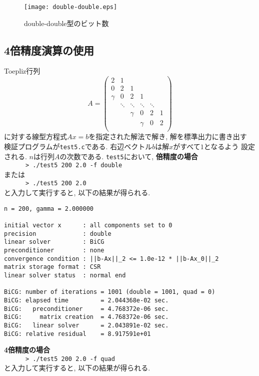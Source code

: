 \documentclass[a4paper]{jarticle}
\begin{document}
{{\begin{figure}[htp]
{\centering 
\texttt{[image: double-double.eps]}
\caption{double-double型のビット数}
\label{fig:residual}
  }
\end{figure}

\subsection{4倍精度演算の使用}
\label{sec:testprog4}
Toepliz行列
\[
A = \left(
\begin{array}{cccccc}
2 & 1 &   &  &  & \\
0 & 2 & 1 &  &  & \\
\gamma & 0& 2 & 1 &  & \\
 & \ddots & \ddots & \ddots & \ddots & \\
 &  &   \gamma &0 &       2   & 1 \\
 &  &  &   \gamma & 0& 2 \\
\end{array}
\right)
\]
に対する線型方程式$Ax=b$を指定された解法で解き, 解を標準出力に書き出す
検証プログラムが\verb|test5.c|である. 
右辺ベクトル$b$は解$x$がすべて$1$となるよう
設定される. $n$は行列$A$の次数である. 
\verb|test5|において, 
\newpage
{\bf 倍精度の場合}\\
\verb+      > ./test5 200 2.0 -f double+ \\
または \\
\verb+      > ./test5 200 2.0+ \\
と入力して実行すると, 以下の結果が得られる. 

\begin{verbatim}
n = 200, gamma = 2.000000

initial vector x      : all components set to 0
precision             : double
linear solver         : BiCG
preconditioner        : none
convergence condition : ||b-Ax||_2 <= 1.0e-12 * ||b-Ax_0||_2
matrix storage format : CSR
linear solver status  : normal end

BiCG: number of iterations = 1001 (double = 1001, quad = 0)
BiCG: elapsed time         = 2.044368e-02 sec.
BiCG:   preconditioner     = 4.768372e-06 sec.
BiCG:     matrix creation  = 4.768372e-06 sec.
BiCG:   linear solver      = 2.043891e-02 sec.
BiCG: relative residual    = 8.917591e+01
\end{verbatim}

{\bf 4倍精度の場合}\\
\verb+      > ./test5 200 2.0 -f quad+\\
と入力して実行すると, 以下の結果が得られる. 

}}
\end{document}
